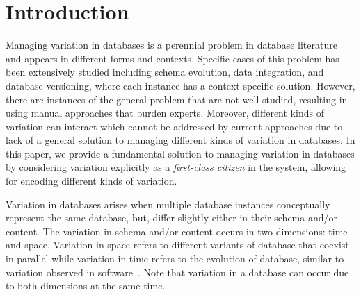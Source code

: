 \section{Introduction}
\label{sec:intro}


\begin{comment}
simple streamline direction:
- variation in db is everywhere
- active research for some instances of it
- other instances aren't well-covered and well-supported
- the combination of instances

a general solution that 
- can model variation for well-covered variation
- others
\end{comment}

Managing variation in databases is a perennial problem in database literature
and appears in different forms and contexts.
Specific cases of this problem has been extensively studied including 
schema evolution, data integration, and database versioning,
where each instance has a context-specific solution.
However, there are instances of the general problem that are
not well-studied, resulting in using manual approaches that burden experts.
Moreover, different kinds of variation can interact which cannot be addressed
by current approaches due to lack of a general solution to managing 
different kinds of variation in databases.
In this paper, we provide a fundamental solution to managing
variation in databases by considering variation explicitly as 
a \emph{first-class citizen}
in the system, allowing for encoding different kinds of variation.

Variation in databases arises when multiple database instances 
conceptually represent the same database, but, differ
slightly either in their schema and/or content. 
The variation in schema and/or content occurs in two dimensions:
time and space. Variation in space refers to different variants of database that
coexist in parallel while variation in time refers to the evolution of 
database, similar to variation observed in software~\cite{EricSPLEvolve19}. 
Note that variation in a database can occur due to both dimensions
at the same time.


